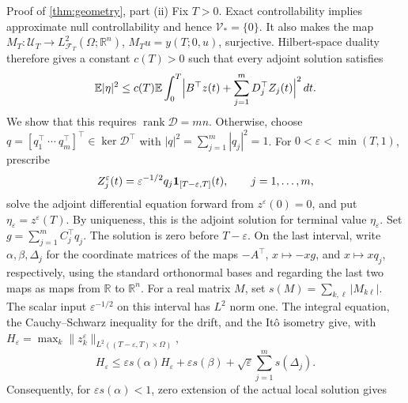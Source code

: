 \documentclass[twocolumn]{autart}
\newcounter{part}
\begin{document}
\vspace{-4mm}

\begin{pf*}{Proof of \cref{thm:geometry}, part \textup{(ii)}}
Fix $T>0$. Exact controllability implies approximate null controllability
and hence $\mathcal V_*=\{0\}$. It also makes the map
$M_T:\mathcal U_T\to L^2_{\mathcal F_T}(\Omega;\mathbb R^n)$,
$M_Tu=y(T;0,u)$, surjective. Hilbert-space duality therefore gives a
constant $c(T)>0$ such that every adjoint solution satisfies\vspace{-2mm}
\begin{equation}\label{eq:exact-observation}
\mathbb E|\eta|^2\leq c(T)\mathbb E\int_0^T
\Bigl|B^\top z(t)+\sum_{j=1}^mD_j^\top Z_j(t)\Bigr|^2\,dt.\vspace{-2mm}
\end{equation}
We show that this requires $\operatorname{rank}\mathcal D=mn$.
Otherwise, choose
$q=[q_1^\top\ \cdots\ q_m^\top]^\top\in\ker\mathcal D^\top$ with
$|q|^2=\sum\limits_{j=1}^m|q_j|^2=1$. For $0<\varepsilon<\min(T,1)$,
prescribe\vspace{-2mm}
\begin{equation*}
Z_j^\varepsilon(t)=\varepsilon^{-1/2}q_j
\mathbf1_{[T-\varepsilon,T]}(t),\qquad j=1,\dots,m,\vspace{-2mm}
\end{equation*}
solve the adjoint differential equation forward from
$z^\varepsilon(0)=0$, and put $\eta_\varepsilon=z^\varepsilon(T)$.
By uniqueness, this is the adjoint solution for terminal value
$\eta_\varepsilon$. Set $g=\sum\limits_{j=1}^mC_j^\top q_j$. The solution is zero before
$T-\varepsilon$. On the last interval, write $\alpha,\beta,\Delta_j$
for the coordinate matrices of the maps $-A^\top$,
$x\mapsto-xg$, and $x\mapsto xq_j$, respectively, using the standard
orthonormal bases and regarding the last two maps as maps from
$\mathbb R$ to $\mathbb R^n$. For a real matrix $M$, set
$s(M)=\sum_{k,\ell}|M_{k\ell}|$. The scalar input
$\varepsilon^{-1/2}$ on this interval has $L^2$ norm one.
The integral equation, the Cauchy--Schwarz inequality for the drift,
and the It\^o isometry give, with
$H_\varepsilon=\max_k\|z_k^\varepsilon\|_{L^2((T-\varepsilon,T)\times\Omega)}$,
\begin{equation*}
H_\varepsilon\leq
\varepsilon s(\alpha)H_\varepsilon+
\varepsilon s(\beta)+\sqrt{\varepsilon}\sum_{j=1}^m s(\Delta_j).
\end{equation*}
Consequently, for $\varepsilon s(\alpha)<1$, zero extension of the
actual local solution gives

\end{pf*}
\end{document}
